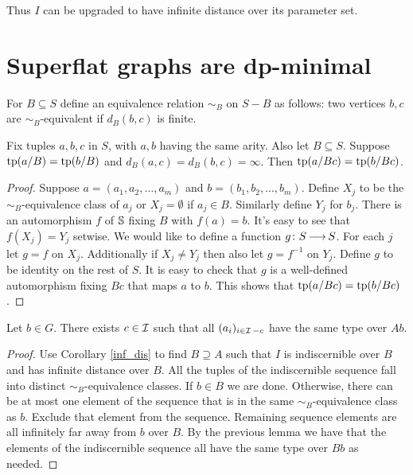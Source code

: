 Thus $I$ can be upgraded to have infinite distance over its parameter set.

\section{Superflat graphs are dp-minimal}

\begin{Definition}
  For $B \subseteq S$ define an equivalence relation $\sim_B$ on $S - B$ as follows:
  two vertices $b,c$ are $\sim_B$-equivalent if $d_B(b,c)$ is finite.
\end{Definition}

\begin{Lemma}
  Fix tuples $a,b,c$ in $S$, with $a,b$ having the same arity.
  Also let $B \subseteq S$.
  Suppose $\operatorname{tp}(a/B) = \operatorname{tp}(b/B)$ and $d_B(a, c) = d_B(b, c) = \infty$.
  Then $\operatorname{tp}(a/Bc) = \operatorname{tp}(b/Bc)$.
\end{Lemma}

\begin{proof}
  Suppose $a = (a_1, a_2, \ldots, a_m)$ and $b = (b_1, b_2, \ldots, b_m)$.
  Define $X_j$ to be the $\sim_B$-equivalence class of $a_j$ or $X_j = \emptyset$ if $a_j \in B$.
  Similarly define $Y_j$ for $b_j$.
  There is an automorphism $f$ of $\mathbb S$ fixing $B$ with $f(a) = b$.
  It's easy to see that $f(X_j) = Y_j$ setwise.
  We would like to define a function $g \colon S \operatorname{\longrightarrow} S$.
  For each $j$ let $g = f$ on $X_j$.
  Additionally if $X_j \neq Y_j$ then also let $g = f^{-1}$ on $Y_j$.
  Define $g$ to be identity on the rest of $S$.
  It is easy to check that $g$ is a well-defined automorphism fixing $Bc$ that maps $a$ to $b$.
  This shows that $\operatorname{tp}(a/Bc) = \operatorname{tp}(b/Bc)$.
\end{proof}

\begin{Lemma} \label{exclude}
  Let $b \in G$.
  There exists $c \in \operatorname{\mathcal I}$ such that all $(a_i)_{i \in \operatorname{\mathcal I} - c}$ have the same type over $Ab$.
\end{Lemma}

\begin{proof}
  Use Corollary \ref{inf_dis} to find $B \supseteq A$ such that $I$ is indiscernible over $B$ and has infinite distance over $B$.
  All the tuples of the indiscernible sequence fall into distinct $\sim_B$-equivalence classes.
  If $b \in B$ we are done.
  Otherwise, there can be at most one element of the sequence that is in the same $\sim_B$-equivalence class as $b$.
  Exclude that element from the sequence.
  Remaining sequence elements are all infinitely far away from $b$ over $B$.
  By the previous lemma we have that the elements of the indiscernible sequence all have the same type over $Bb$ as needed.
\end{proof}


